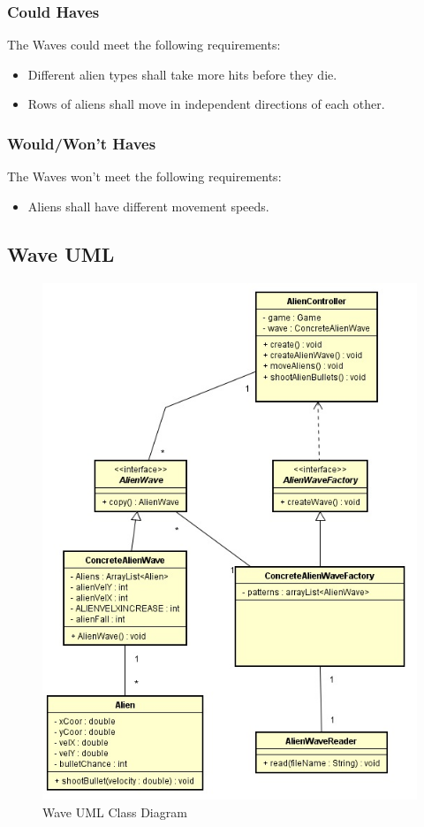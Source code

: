\documentclass[10pt]{article}
\begin{document}
\subsubsection{Could Haves}
The Waves could meet the following requirements:
\begin{itemize}
	\item Different alien types shall take more hits before they die.
	\item Rows of aliens shall move in independent directions of each other.
\end{itemize}
\subsubsection{Would/Won't Haves}
The Waves won't meet the following requirements:
\begin{itemize}
	\item Aliens shall have different movement speeds.
\end{itemize}
\newpage
\subsection{Wave UML}
\begin{figure}[ht!]
\centering
\includegraphics[width=13cm]{waveUML.jpg}
\caption{Wave UML Class Diagram}
\end{figure}
\end{document}
